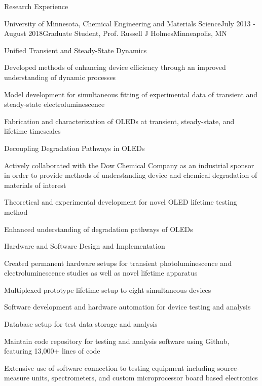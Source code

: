 \documentclass{resume} %
\begin{document}
\begin{rSection}{Research Experience}

\begin{rSubsection}{University of Minnesota, Chemical Engineering and Materials Science}{July 2013 - August 2018}{Graduate Student, Prof. Russell J Holmes}{Minneapolis, MN}
\vspace{-.5 em}
\hspace{-1em}{\em Supported via UMN-Dow Chemical University Partnership Initiative} \smallskip \\
\begin{rSubsubsection}{Unified Transient and Steady-State Dynamics}
\item Developed methods of enhancing device efficiency through an improved understanding of dynamic processes 
\item Model development for simultaneous fitting of experimental data of transient and steady-state electroluminescence 
\item Fabrication and characterization of OLEDs at transient, steady-state, and lifetime timescales
\end{rSubsubsection}
\begin{rSubsubsection}{Decoupling Degradation Pathways in OLEDs}
\item Actively collaborated with the Dow Chemical Company as an industrial sponsor in order to provide methods of understanding device and chemical degradation of materials of interest
\item Theoretical and experimental development for novel OLED lifetime testing method 
\item Enhanced understanding of degradation pathways of OLEDs
\end{rSubsubsection}
\begin{rSubsubsection}{Hardware and Software Design and Implementation}
\item Created permanent hardware setups for transient photoluminescence and electroluminescence studies as well as novel lifetime apparatus
\item Multiplexed prototype lifetime setup to eight simultaneous devices
\item Software development and hardware automation for device testing and analysis
\item Database setup for test data storage and analysis
\item Maintain code repository for testing and analysis software using Github, featuring 13,000+ lines of code
\item Extensive use of software connection to testing equipment including source-measure units, spectrometers, and custom microprocessor board based electronics
\end{rSubsubsection}
\end{rSubsection}


\end{rSection}
\end{document}
